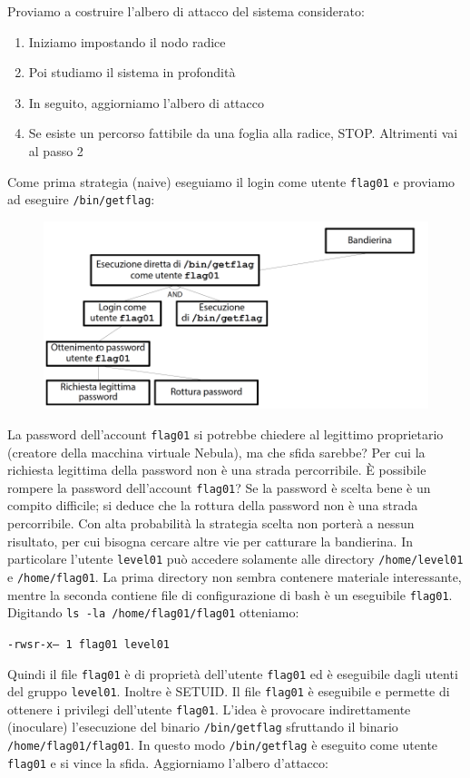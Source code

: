 Proviamo a costruire l'albero di attacco del sistema considerato:
\begin{enumerate}
    \item Iniziamo impostando il nodo radice
    \item Poi studiamo il sistema in profondità
    \item In seguito, aggiorniamo l'albero di attacco
    \item Se esiste un percorso fattibile da una foglia alla
radice, STOP. Altrimenti vai al passo 2
\end{enumerate}
Come prima strategia (naive) eseguiamo il login come utente \texttt{flag01} e proviamo ad eseguire \texttt{/bin/getflag}:

\begin{figure}[hbpt!]
    \centering
    \includegraphics[width=0.8 \textwidth]{./Images/cap5/5.3.png}
\end{figure}
\FloatBarrier

La password dell'account \texttt{flag01} si potrebbe chiedere al legittimo proprietario (creatore della macchina virtuale Nebula), ma che sfida sarebbe? Per cui la richiesta legittima della password non è una strada percorribile. È possibile rompere la password dell'account \texttt{flag01}? Se la password è scelta bene è un compito difficile; si deduce che la rottura della password non è una strada percorribile. Con alta probabilità la strategia scelta non porterà a nessun risultato, per cui bisogna cercare altre vie per catturare la bandierina. In particolare l'utente \texttt{level01} può accedere solamente alle directory \texttt{/home/level01} e \texttt{/home/flag01}. La prima directory non sembra contenere materiale interessante, mentre la seconda contiene file di configurazione di bash è un eseguibile \texttt{flag01}. Digitando \texttt{ls -la /home/flag01/flag01} otteniamo:
\begin{center}
    \texttt{-rwsr-x--- 1 flag01 level01}
\end{center}
Quindi il file \texttt{flag01} è di proprietà dell'utente \texttt{flag01} ed è eseguibile dagli utenti del gruppo \texttt{level01}. Inoltre è SETUID. Il file \texttt{flag01} è eseguibile e permette di ottenere i privilegi dell'utente \texttt{flag01}. L'idea è provocare indirettamente (inoculare) l'esecuzione del binario \texttt{/bin/getflag} sfruttando il binario \texttt{/home/flag01/flag01}. In questo modo \texttt{/bin/getflag} è eseguito come utente \texttt{flag01} e si vince la sfida. Aggiorniamo l'albero d'attacco:

